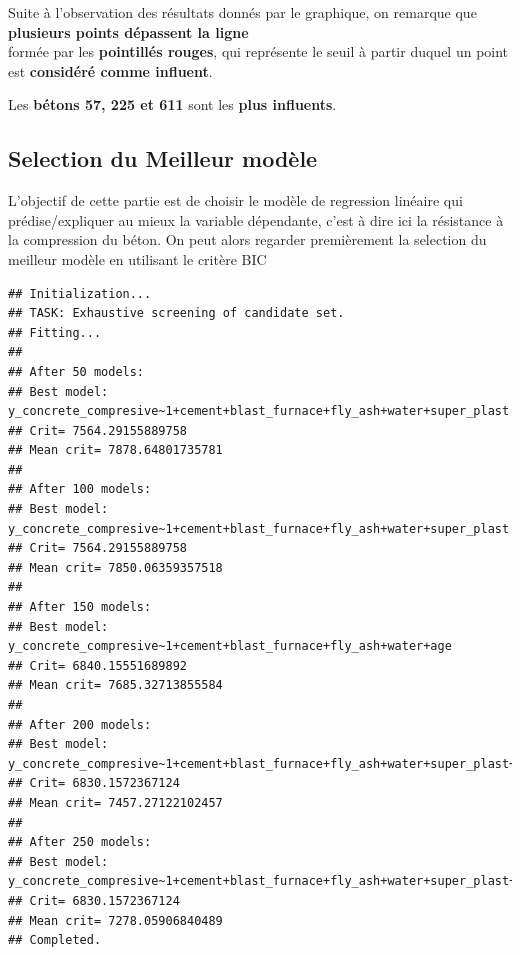 \documentclass[
  12pt,
]{article}
\begin{document}
Suite à l'observation des résultats donnés par le graphique, on remarque
que \textbf{plusieurs points dépassent la ligne}\\
formée par les \textbf{pointillés rouges}, qui représente le seuil à
partir duquel un point est \textbf{considéré comme influent}.

Les \textbf{bétons 57, 225 et 611} sont les \textbf{plus influents}.

\subsection{Selection du Meilleur
modèle}\label{selection-du-meilleur-moduxe8le}

L'objectif de cette partie est de choisir le modèle de regression
linéaire qui prédise/expliquer au mieux la variable dépendante, c'est à
dire ici la résistance à la compression du béton. On peut alors regarder
premièrement la selection du meilleur modèle en utilisant le critère BIC

\begin{verbatim}
## Initialization...
## TASK: Exhaustive screening of candidate set.
## Fitting...
## 
## After 50 models:
## Best model: y_concrete_compresive~1+cement+blast_furnace+fly_ash+water+super_plast
## Crit= 7564.29155889758
## Mean crit= 7878.64801735781
## 
## After 100 models:
## Best model: y_concrete_compresive~1+cement+blast_furnace+fly_ash+water+super_plast
## Crit= 7564.29155889758
## Mean crit= 7850.06359357518
## 
## After 150 models:
## Best model: y_concrete_compresive~1+cement+blast_furnace+fly_ash+water+age
## Crit= 6840.15551689892
## Mean crit= 7685.32713855584
## 
## After 200 models:
## Best model: y_concrete_compresive~1+cement+blast_furnace+fly_ash+water+super_plast+age
## Crit= 6830.1572367124
## Mean crit= 7457.27122102457
## 
## After 250 models:
## Best model: y_concrete_compresive~1+cement+blast_furnace+fly_ash+water+super_plast+age
## Crit= 6830.1572367124
## Mean crit= 7278.05906840489
## Completed.
\end{verbatim}
\end{document}
